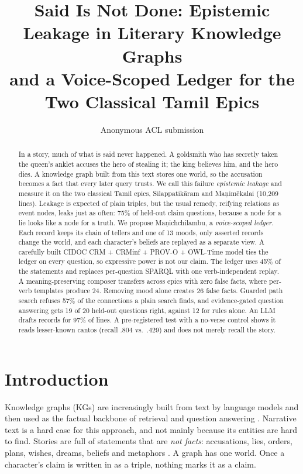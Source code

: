 \documentclass[11pt]{article}
\title{Said Is Not Done: Epistemic Leakage in Literary Knowledge Graphs\\and a Voice-Scoped Ledger for the Two Classical Tamil Epics}
\author{Anonymous ACL submission}
\newcommand{\sysname}{Ma\d{n}ichchilambu}
\begin{document}
\maketitle

\begin{abstract}
In a story, much of what is said never happened. A goldsmith who has secretly taken the queen's anklet accuses the hero of stealing it; the king believes him, and the hero dies. A knowledge graph built from this text stores one world, so the accusation becomes a fact that every later query trusts. We call this failure \emph{epistemic leakage} and measure it on the two classical Tamil epics, Silappatik\={a}ram and Ma\d{n}im\={e}kalai (10,209 lines). Leakage is expected of plain triples, but the usual remedy, reifying relations as event nodes, leaks just as often: 75\% of held-out claim questions, because a node for a lie looks like a node for a truth. We propose \sysname{}, a \emph{voice-scoped ledger}. Each record keeps its chain of tellers and one of 13 moods, only asserted records change the world, and each character's beliefs are replayed as a separate view. A carefully built CIDOC CRM + CRMinf + PROV-O + OWL-Time model ties the ledger on every question, so expressive power is not our claim. The ledger uses 45\% of the statements and replaces per-question SPARQL with one verb-independent replay. A meaning-preserving composer transfers across epics with zero false facts, where per-verb templates produce 24. Removing mood alone creates 26 false facts. Guarded path search refuses 57\% of the connections a plain search finds, and evidence-gated question answering gets 19 of 20 held-out questions right, against 12 for rules alone. An LLM drafts records for 97\% of lines. A pre-registered test with a no-verse control shows it reads lesser-known cantos (recall .804 vs.\ .429) and does not merely recall the story.
\end{abstract}

\section{Introduction}
\label{sec:intro}

Knowledge graphs (KGs) are increasingly built from text by language models and then used as the factual backbone of retrieval and question answering \citep{Hogan2021KnowledgeGraphs,Pan2024UnifyingLarge,Xu2024LargeLanguage,Edge2024FromLocal}. Narrative text is a hard case for this approach, and not mainly because its entities are hard to find. Stories are full of statements that are \emph{not facts}: accusations, lies, orders, plans, wishes, dreams, beliefs and metaphors \citep{Piper2021NarrativeTheory,Santana2023SurveyNarrative}. A graph has one world. Once a character's claim is written in as a triple, nothing marks it as a claim.
\end{document}
